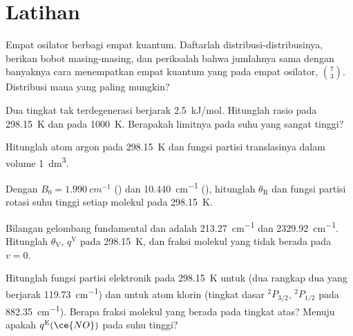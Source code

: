 \section{Latihan}

\begin{exercise}[$\star$]\label{exo:b3:partition-functions:1}
Empat osilator berbagi empat kuantum. Daftarlah distribusi-distribusinya,
berikan bobot masing-masing, dan periksalah bahwa jumlahnya sama dengan
banyaknya cara menempatkan empat kuantum yang  pada empat
osilator, $\binom{7}{3}$. Distribusi mana yang paling mungkin?
\end{exercise}

\begin{exercise}[$\star$]\label{exo:b3:partition-functions:2}
Dua tingkat tak terdegenerasi berjarak \qty{2.5}{kJ/mol}. Hitunglah rasio
 pada \qty{298.15}{K} dan pada \qty{1000}{K}. Berapakah limitnya
pada suhu yang sangat tinggi?
\end{exercise}

\begin{exercise}[$\star$]\label{exo:b3:partition-functions:3}
Hitunglah  atom argon pada \qty{298.15}{K} dan fungsi
partisi translasinya dalam volume \qty{1}{dm^3}.
\end{exercise}

\begin{exercise}[$\star$]\label{exo:b3:partition-functions:4}
Dengan $B_0 = \qty{1.990}{cm^{-1}}$ () dan \qty{10.440}{cm^{-1}}
(), hitunglah $\theta_{\mathrm R}$ dan fungsi partisi rotasi suhu
tinggi setiap molekul pada \qty{298.15}{K}.
\end{exercise}

\begin{exercise}[$\star\star$]\label{exo:b3:partition-functions:5}
Bilangan gelombang fundamental  dan  adalah \qty{213.27}{cm^{-1}}
dan \qty{2329.92}{cm^{-1}}. Hitunglah $\theta_{\mathrm V}$, $q^{\mathrm V}$ pada
\qty{298.15}{K}, dan fraksi molekul yang tidak berada pada $v = 0$.
\end{exercise}

\begin{exercise}[$\star\star$]\label{exo:b3:partition-functions:6}
Hitunglah fungsi partisi elektronik pada \qty{298.15}{K} untuk  (dua
 rangkap dua yang berjarak \qty{119.73}{cm^{-1}}) dan untuk
atom klorin (tingkat dasar ${}^2P_{3/2}$, ${}^2P_{1/2}$ pada \qty{882.35}{cm^{-1}}).
Berapa fraksi molekul  yang berada pada tingkat atas? Menuju apakah
$q^{\mathrm E}(\ce{NO})$ pada suhu tinggi?
\end{exercise}

